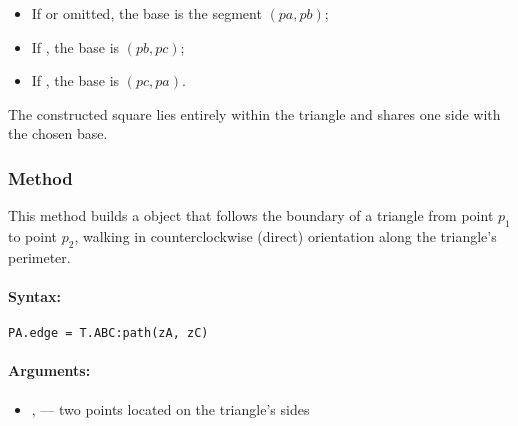 \begin{itemize}
  \item If  or omitted, the base is the segment $(pa, pb)$;
  \item If , the base is $(pb, pc)$;
  \item If , the base is $(pc, pa)$.
\end{itemize}

\noindent
The constructed square lies entirely within the triangle and shares one side with the chosen base.

\vspace{1em}

\begin{tkzexample}[latex=.5\textwidth]
\end{tkzexample}


\subsubsection{Method }
\label{ssub:method_tkzmeth_triangle_path}

This method builds a  object that follows the boundary of a triangle from point $p_1$ to point $p_2$, walking in counterclockwise (direct) orientation along the triangle's perimeter.

\paragraph{Syntax:}
\begin{verbatim}
PA.edge = T.ABC:path(zA, zC)
\end{verbatim}

\paragraph{Arguments:}
\begin{itemize}
\item {},  — two points located on the triangle’s sides
\end{itemize}

